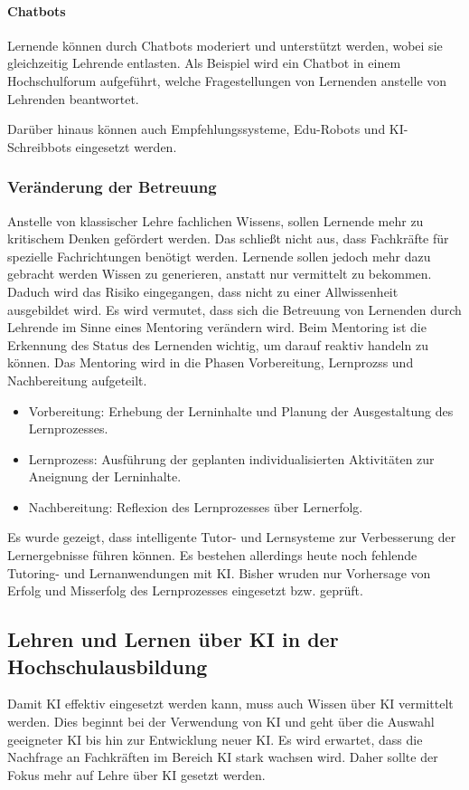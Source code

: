\paragraph*{Chatbots}
Lernende können durch Chatbots moderiert und unterstützt werden, wobei sie gleichzeitig Lehrende entlasten. Als Beispiel wird ein Chatbot in einem Hochschulforum aufgeführt, welche Fragestellungen von Lernenden anstelle von Lehrenden beantwortet. \cite*[S. 18ff.]{Witt.2020}

Darüber hinaus können auch Empfehlungssysteme, Edu-Robots und KI-Schreibbots eingesetzt werden. \cite*[S. 18-21]{Witt.2020}

\subsubsection*{Veränderung der Betreuung}
Anstelle von klassischer Lehre fachlichen Wissens, sollen Lernende mehr zu kritischem Denken gefördert werden. Das schließt nicht aus, dass Fachkräfte für spezielle Fachrichtungen benötigt werden. Lernende sollen jedoch mehr dazu gebracht werden Wissen zu generieren, anstatt nur vermittelt zu bekommen. Daduch wird das Risiko eingegangen, dass nicht zu einer \glqq Allwissenheit\grqq{} ausgebildet wird. Es wird vermutet, dass sich die Betreuung von Lernenden durch Lehrende im Sinne eines Mentoring verändern wird. Beim Mentoring ist die Erkennung des Status des Lernenden wichtig, um darauf reaktiv handeln zu können. Das Mentoring wird in die Phasen Vorbereitung, Lernprozss und Nachbereitung aufgeteilt.
\begin{itemize}
    \item Vorbereitung: Erhebung der Lerninhalte und Planung der Ausgestaltung des Lernprozesses.
    \item Lernprozess: Ausführung der geplanten individualisierten Aktivitäten zur Aneignung der Lerninhalte.
    \item Nachbereitung: Reflexion des Lernprozesses über Lernerfolg.
\end{itemize} \cite*[S. 22f.]{Witt.2020}
Es wurde gezeigt, dass intelligente Tutor- und Lernsysteme zur Verbesserung der Lernergebnisse führen können. Es bestehen allerdings heute noch fehlende Tutoring- und Lernanwendungen mit KI. Bisher wruden nur Vorhersage von Erfolg und Misserfolg des Lernprozesses eingesetzt bzw. geprüft. \cite*[S. 24]{Witt.2020}

\subsection{Lehren und Lernen über KI in der Hochschulausbildung}
Damit KI effektiv eingesetzt werden kann, muss auch Wissen über KI vermittelt werden. Dies beginnt bei der Verwendung von KI und geht über die Auswahl geeigneter KI bis hin zur Entwicklung neuer KI. Es wird erwartet, dass die Nachfrage an Fachkräften im Bereich KI stark wachsen wird. Daher sollte der Fokus mehr auf Lehre über KI gesetzt werden. \cite*[S. 26]{Witt.2020}


